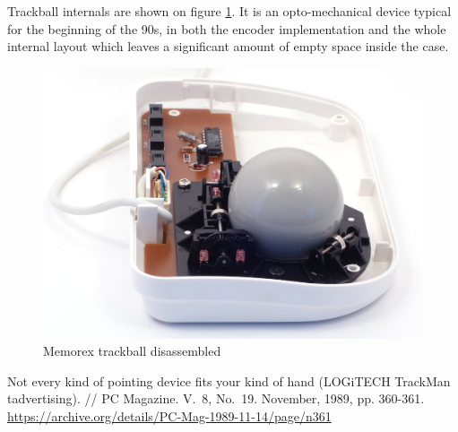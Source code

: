 \documentclass[11pt, a4paper]{article}
\begin{document}
Trackball internals are shown on figure \ref{fig:MemorexInside}. It is an opto-mechanical device typical for the beginning of the 90s, in both the encoder implementation and the whole internal layout which leaves a significant amount of empty space inside the case.

\begin{figure}[h]
    \centering
    \includegraphics[scale=0.6]{1994_memorex_trackball/inside_30.jpg}
    \caption{Memorex trackball disassembled}
    \label{fig:MemorexInside}
\end{figure}

\begin{thebibliography}{9}
 Not every kind of pointing device fits your kind of hand (LOGiTECH TrackMan tadvertising). // PC Magazine. V.~8, No.~19. November, 1989, pp. 360-361. \url{https://archive.org/details/PC-Mag-1989-11-14/page/n361}
\end{thebibliography}
\end{document}
